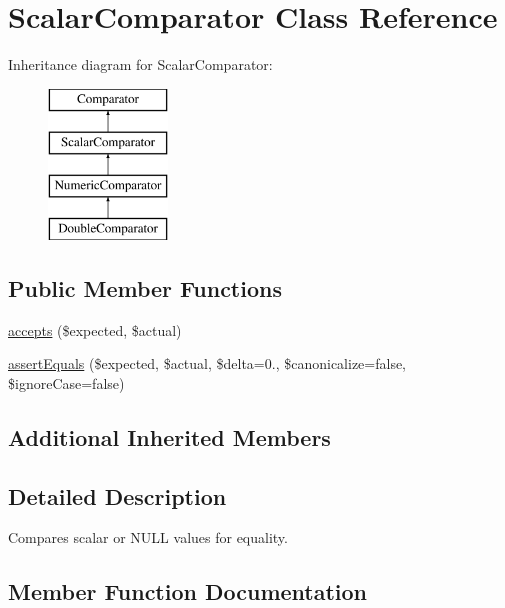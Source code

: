 \hypertarget{class_sebastian_bergmann_1_1_comparator_1_1_scalar_comparator}{}\section{Scalar\+Comparator Class Reference}
\label{class_sebastian_bergmann_1_1_comparator_1_1_scalar_comparator}
Inheritance diagram for Scalar\+Comparator\+:\begin{figure}[H]
\begin{center}
\leavevmode
\includegraphics[height=4.000000cm]{class_sebastian_bergmann_1_1_comparator_1_1_scalar_comparator}
\end{center}
\end{figure}
\subsection*{Public Member Functions}
\begin{DoxyCompactItemize}
\item 
\mbox{\hyperlink{class_sebastian_bergmann_1_1_comparator_1_1_scalar_comparator_ae9bdf0cba02ce3470169280656cdeb84}{accepts}} (\$expected, \$actual)
\item 
\mbox{\hyperlink{class_sebastian_bergmann_1_1_comparator_1_1_scalar_comparator_adb3679ea06503114394431cb250ec5a4}{assert\+Equals}} (\$expected, \$actual, \$delta=0., \$canonicalize=false, \$ignore\+Case=false)
\end{DoxyCompactItemize}
\subsection*{Additional Inherited Members}


\subsection{Detailed Description}
Compares scalar or N\+U\+LL values for equality. 

\subsection{Member Function Documentation}
\mbox{\label{class_sebastian_bergmann_1_1_comparator_1_1_scalar_comparator_ae9bdf0cba02ce3470169280656cdeb84}} 

